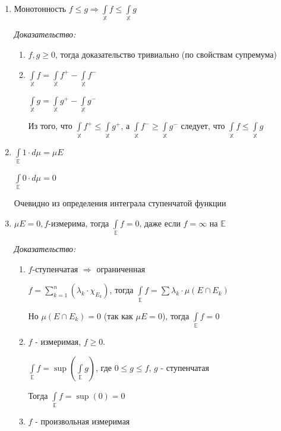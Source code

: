 \documentclass[paper=a4, fontsize=17pt]{article}
\begin{document}
\begin{enumerate}
	\item Монотонность
	$f \leqslant g \Rightarrow \int\limits_{\mathds{X}} f \leqslant \int\limits_{\mathds{X}} g$

	\emph{Доказательство:}
	\begin{enumerate}
		\item $f, g \geqslant 0$, тогда доказательство тривиально (по свойствам супремума)
		\item $\int\limits_{\mathds{X}} f = \int\limits_{\mathds{X}} f^+ - \int\limits_{\mathds{X}} f^-$

		$\int\limits_{\mathds{X}} g = \int\limits_{\mathds{X}} g^+ - \int\limits_{\mathds{X}} g^-$

		Из того, что $\int\limits_{\mathds{X}} f^+ \leqslant \int\limits_{\mathds{X}} g^+$, а $\int\limits_{\mathds{X}} f^- \geqslant \int\limits_{\mathds{X}} g^-$ следует, что $\int\limits_{\mathds{X}} f \leqslant \int\limits_{\mathds{X}} g$
	\end{enumerate}

	\item
	$\int\limits_{\mathds{E}} 1 \cdot d \mu = \mu E$

	$\int\limits_{\mathds{E}} 0 \cdot d \mu = 0$

	Очевидно из определения интеграла ступенчатой функции

	\item $\mu E = 0, f $-измерима, тогда $\int\limits_{\mathds{E}}f = 0$, даже если $f = \infty$ на $\mathds{E}$

	\emph{Доказательство:}

	\begin{enumerate}
		\item $f $-ступенчатая $\Rightarrow$ ограниченная

		$f = \sum\limits_{k = 1}^{n}(\lambda_k \cdot \chi_{E_k})$, тогда $\int\limits_\mathds{E} f = \sum \lambda_k \cdot \mu (E \cap E_k)$

		Но $\mu (E \cap E_k) = 0$ (так как $\mu E = 0$), тогда $\int\limits_\mathds{E} f = 0$

		\item $f$ - измеримая, $f \geqslant 0$.

		$\int\limits_\mathds{E} f = \sup (\int\limits_\mathds{E} g)$, где $0 \leqslant g \leqslant f$, $g$ - ступенчатая

		Тогда $\int\limits_\mathds{E} f = \sup (0) = 0$

		\item
		$f$ - произвольная измеримая


\end{enumerate}
\end{enumerate}
\end{document}
